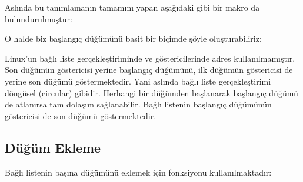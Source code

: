\documentclass[a4paper,10pt,turkish]{sphinxmanual}
\begin{document}
\sphinxAtStartPar
Aslında bu tanımlamanın tamamını yapan aşağıdaki gibi bir makro da bulundurulmuştur:

\begin{sphinxVerbatim}[commandchars=\\\{\}]
\end{sphinxVerbatim}

\sphinxAtStartPar
O halde biz başlangıç düğümünü basit bir biçimde şöyle oluşturabiliriz:

\begin{sphinxVerbatim}[commandchars=\\\{\}]
\end{sphinxVerbatim}

\sphinxAtStartPar
Linux’un bağlı liste gerçekleştiriminde  ve  göstericilerinde  adres
kullanılmamıştır. Son düğümün  göstericisi  yerine başlangıç düğümünü, ilk düğümün
 göstericisi de  yerine son düğümü göstermektedir. Yani aslında bağlı liste
gerçekleştirimi döngüsel (circular) gibidir. Herhangi bir düğümden başlanarak başlangıç düğümü de
atlanırsa tam dolaşım sağlanabilir. Bağlı listenin başlangıç düğümünün  göstericisi de son
düğümü göstermektedir.


\subsection{Düğüm Ekleme}
\label{\detokenize{kernellinkedlistandhashtable:dugum-ekleme}}
\sphinxAtStartPar
Bağlı listenin başına  düğümünü eklemek için  fonksiyonu kullanılmaktadır:

\begin{sphinxVerbatim}[commandchars=\\\{\}]
\end{sphinxVerbatim}
\end{document}
